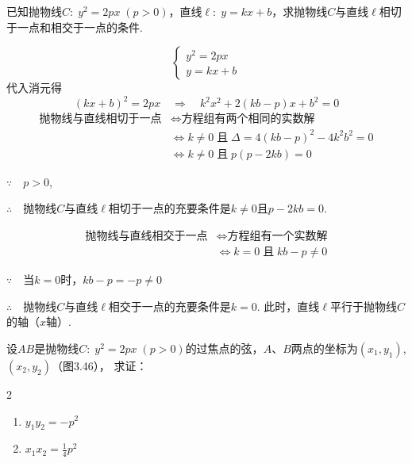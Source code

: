 \begin{example}
    已知抛物线$C:\; y^2=2px\; (p>0)$，直线$\ell:\; y=kx+b$，求抛物线$C$与直线$\ell$相切于一点和相交于一点的条件.
\end{example}

\begin{solution}
\[\begin{cases}
    y^2=2px\\ y=kx+b
\end{cases}\]
代入消元得
\[(kx+b)^2=2px \quad \Rightarrow\quad k^2x^2+2(kb-p)x+b^2=0\]
\[\begin{split}
\text{抛物线与直线相切于一点} &\Longleftrightarrow \text{方程组有两个相同的实数解}\\
&\Longleftrightarrow k\ne 0\; \text{且}\; \Delta=4(kb-p)^2-4k^2b^2=0\\
&\Longleftrightarrow k\ne 0\; \text{且}\; p(p-2kb)=0
\end{split}\]

$\because\quad p>0$,

$\therefore\quad $抛物线$C$与直线$\ell$相切于一点的充要条件是$k\ne 0$且$p-2kb=0$.

\[\begin{split}
    \text{抛物线与直线相交于一点}&\Longleftrightarrow \text{方程组有一个实数解}\\
    &\Longleftrightarrow k= 0\; \text{且}\; kb-p\ne 0
\end{split}\]

$\because\quad $当$k=0$时，$kb-p=-p\ne 0$

$\therefore\quad$抛物线$C$与直线$\ell$相交于一点的充要条件是$k=0$. 此时，直线$\ell$平行于抛物线$C$的轴（$x$轴）.
\end{solution}

\begin{example}
    设$AB$是抛物线$C:\; y^2=2px\; (p>0)$的过焦点的弦，$A$、$B$两点的坐标为$(x_1,y_1)$, $(x_2,y_2)$（图3.46），
求证：
\begin{multicols}{2}
    \begin{enumerate}[(1)]
        \item $y_1y_2=-p^2$
        \item $x_1x_2=\frac{1}{4}p^2$
    \end{enumerate}
\end{multicols}
\end{example}

